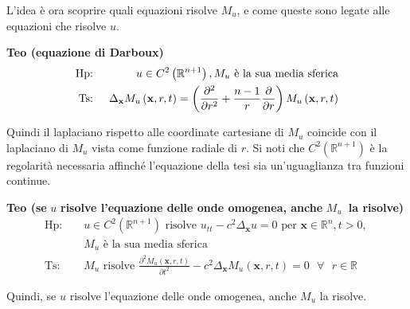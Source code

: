 \documentclass{article}
\begin{document}
L'idea \`{e} ora scoprire quali equazioni risolve $M_{u}$, e come queste
sono legate alle equazioni che risolve $u$.

\textbf{Teo (equazione di Darboux)}%
\begin{eqnarray*}
\text{Hp}\text{: } &&u\in C^{2}\left( 
\mathbb{R}
^{n+1}\right) ,M_{u}\text{ \`{e} la sua media sferica} \\
\text{Ts}\text{: } &&\Delta _{\mathbf{x}}M_{u}\left( \mathbf{x},r,t\right)
=\left( \frac{\partial ^{2}}{\partial r^{2}}+\frac{n-1}{r}\frac{\partial }{%
\partial r}\right) M_{u}\left( \mathbf{x},r,t\right)
\end{eqnarray*}

Quindi il laplaciano rispetto alle coordinate cartesiane di $M_{u}$ coincide
con il laplaciano di $M_{u}$ vista come funzione radiale di $r$. Si noti che 
$C^{2}\left( 
\mathbb{R}
^{n+1}\right) $ \`{e} la regolarit\`{a} necessaria affinch\'{e} l'equazione
della tesi sia un'uguaglianza tra funzioni continue.

\textbf{Teo (se }$u$ \textbf{risolve l'equazione delle onde omogenea, anche }%
$M_{u}$\textbf{\ la risolve)}%
\begin{eqnarray*}
\text{Hp}\text{: } &&u\in C^{2}\left( 
\mathbb{R}
^{n+1}\right) \text{ risolve }u_{tt}-c^{2}\Delta _{\mathbf{x}}u=0\text{ per }%
\mathbf{x}\in 
\mathbb{R}
^{n},t>0\text{, } \\
&&M_{u}\text{ \`{e} la sua media sferica} \\
\text{Ts}\text{: } &&M_{u}\text{ risolve }\frac{\partial ^{2}M_{u}\left( 
\mathbf{x},r,t\right) }{\partial t^{2}}-c^{2}\Delta _{\mathbf{x}}M_{u}\left( 
\mathbf{x},r,t\right) =0\text{ }\forall \text{ }r\in 
\mathbb{R}%
\end{eqnarray*}

Quindi, se $u$ risolve l'equazione delle onde omogenea, anche $M_{u}$ la
risolve.
\end{document}
